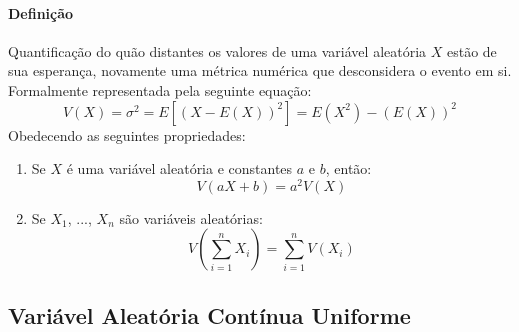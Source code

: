 \documentclass{article}
\begin{document}
            \paragraph{Definição}Quantificação do quão distantes os valores de uma variável aleatória $X$ estão de sua esperança, novamente uma métrica numérica que desconsidera o evento em si. Formalmente representada pela seguinte equação:
                \begin{equation}
                    \boxed{
                        V(X) = \sigma^{2} = 
                        E[(X - E(X))^{2}] =
                        E(X^{2}) - (E(X))^{2}
                    }
                \end{equation}
            Obedecendo as seguintes propriedades:
                \begin{enumerate}[rightmargin = \leftmargin, noitemsep]
                    \item Se $X$ é uma variável aleatória e constantes $a$ e $b$, então:
                        \begin{equation}
                            \boxed{
                                V(a X + b) = a^{2} V(X)
                            }
                        \end{equation}
                    \item Se $X_{1}$, ..., $X_{n}$ são variáveis aleatórias:
                        \begin{equation}
                            \boxed{
                                V \left( \sum_{i=1}^{n} X_{i} \right) = \sum_{i=1}^{n} V(X_{i})
                            }
                        \end{equation}
                \end{enumerate}

        \subsection{Variável Aleatória Contínua Uniforme}
\end{document}
